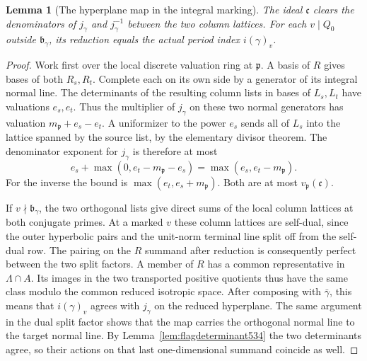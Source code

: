 \documentclass[a4paper,11pt]{article}
\newtheorem{lemma}[proposition]{Lemma}
\theoremstyle{definition}
\theoremstyle{remark}
\numberwithin{equation}{section}
\begin{document}
\begin{lemma}[The hyperplane map in the integral marking]
\leavevmode\label{lem:hyperplanemark534}
The ideal \(\mathfrak c\) clears the denominators of \(j_\gamma\)
and \(j_\gamma^{-1}\) between the two column lattices.
For each \(v\mid Q_0\) outside \(\mathfrak b_\gamma\), its
reduction equals the actual period index \(i(\gamma)_v\).
\end{lemma}
\begin{proof}
Work first over the local discrete valuation ring at
\(\mathfrak p\). A basis of \(R\) gives bases of both \(R_s,R_t\).
Complete each on its own side by a generator of its integral
normal line. The determinants of the resulting column lists in
bases of \(L_s,L_t\) have valuations \(e_s,e_t\).
Thus the multiplier of \(j_\gamma\) on these two normal generators
has valuation \(m_{\mathfrak p}+e_s-e_t\). A uniformizer to
the power \(e_s\) sends all of \(L_s\) into the lattice spanned
by the source list, by the elementary divisor theorem. The
denominator exponent for \(j_\gamma\) is therefore at most
\[
        e_s+\max(0,e_t-m_{\mathfrak p}-e_s)
                          =\max(e_s,e_t-m_{\mathfrak p}) .
\]
For the inverse the bound is \(\max(e_t,e_s+m_{\mathfrak p})\).
Both are at most \(v_{\mathfrak p}(\mathfrak c)\).

If \(v\nmid\mathfrak b_\gamma\), the two orthogonal lists give
direct sums of the local column lattices at both conjugate primes.
At a marked \(v\) these column lattices are self-dual, since
the outer hyperbolic pairs and the unit-norm terminal line
split off from the self-dual row. The pairing on the \(R\)
summand after reduction is consequently perfect between the
two split factors. A member of \(R\) has a common representative
in \(\Lambda\cap A\). Its images in the two transported positive
quotients thus have the same class modulo the common reduced
isotropic space. After composing with \(\bar\gamma\), this
means that \(i(\gamma)_v\) agrees with \(j_\gamma\) on the
reduced hyperplane. The same argument in the dual split factor
shows that the map carries the orthogonal normal line to the
target normal line. By Lemma~\ref{lem:flagdeterminant534}
the two determinants agree, so their actions on that last
one-dimensional summand coincide as well.
\end{proof}
\end{document}
